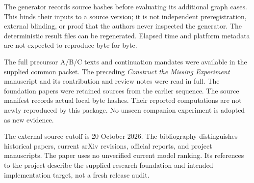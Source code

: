 \documentclass[11pt,letterpaper]{article}
\theoremstyle{remark}\newtheorem{remark}{Remark}[section]
\begin{document}
The generator records source hashes before evaluating its additional graph cases. This binds their inputs to a source version; it is not independent preregistration, external blinding, or proof that the authors never inspected the generator. The deterministic result files can be regenerated. Elapsed time and platform metadata are not expected to reproduce byte-for-byte.

The full precursor A/B/C texts and continuation mandates were available in the supplied common packet. The preceding \emph{Construct the Missing Experiment} manuscript and its contribution and review notes were read in full. The foundation papers were retained sources from the earlier sequence. The source manifest records actual local byte hashes. Their reported computations are not newly reproduced by this package. No unseen companion experiment is adopted as new evidence.

The external-source cutoff is 20 October 2026. The bibliography distinguishes historical papers, current arXiv revisions, official reports, and project manuscripts. The paper uses no unverified current model ranking. Its references to the project describe the supplied research foundation and intended implementation target, not a fresh release audit.
\end{document}
